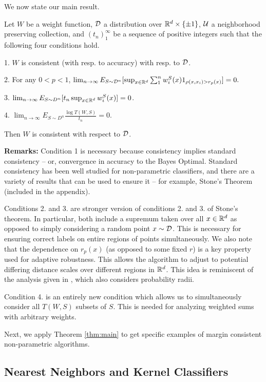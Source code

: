 We now state our main result.
\begin{thm}\label{thm:main}
Let $W$ be a weight function, ${\mathcal D}$ a distribution over $\mathbb R^d \times \{\pm 1\}$, ${\mathcal U}$ a neighborhood preserving collection, and $(t_n)_1^{\infty}$ be a sequence of positive integers such that the following four conditions hold. 

1. $W$ is consistent (with resp. to accuracy) with resp. to ${\mathcal D}$.

2. For any $0 < p < 1$, $\lim_{n \to \infty} E_{S \sim {\mathcal D}^n} [\sup_{x \in \mathbb R^d} \sum_1^n w_i^S(x)1_{\rho(x, x_i) > r_p(x)}] = 0.$

3. $\lim_{n \to \infty} E_{S \sim D^n}[t_n \sup_{x \in \mathbb R^d} w_i^S(x)] = 0$.

4. $\lim_{n \to \infty} E_{S \sim D^n}\frac{\log T(W,S)}{t_n} = 0$.

Then $W$ is \ncons\emph{ }consistent with respect to ${\mathcal D}$.
\end{thm}

\textbf{Remarks:} Condition 1 is necessary because \ncons\emph{ }consistency implies standard consistency -- or, convergence in accuracy to the Bayes Optimal. Standard consistency has been well studied for non-parametric classifiers, and there are a variety of results that can be used to ensure it -- for example, Stone's Theorem (included in the appendix). 

Conditions 2. and 3. are stronger version of conditions 2. and 3. of Stone's theorem. In particular, both include a supremum taken over all $x \in \mathbb R^d$ as opposed to simply considering a random point $x \sim {\mathcal D}$. This is necessary for ensuring correct labels on entire regions of points simultaneously. We also note that the dependence on $r_p(x)$ (as opposed to some fixed $r$) is a key property used for adaptive robustness. This allows the algorithm to adjust to potential differing distance scales over different regions in $\mathbb R^d$. This idea is reminiscent of the analysis given in \cite{Dasgupta14}, which also considers probability radii.

Condition 4. is an entirely new condition which allows us to simultaneously consider all $T(W,S)$ subsets of $S$. This is needed for analyzing weighted sums with arbitrary weights.

Next, we apply Theorem \ref{thm:main} to get specific examples of margin consistent non-parametric algorithms.

\subsection{Nearest Neighbors and Kernel Classifiers}

